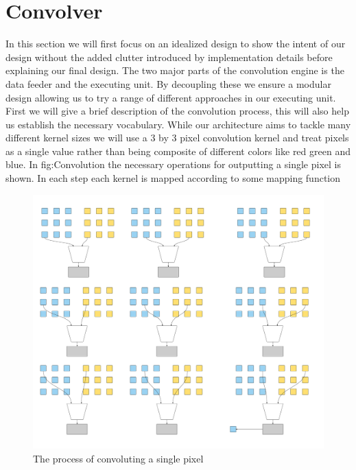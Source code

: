 \section{Convolver}
In this section we will first focus on an idealized design to show the intent of our design without the added clutter introduced by implementation details before explaining our final design.
The two major parts of the convolution engine is the data feeder and the executing unit. By decoupling these we ensure a modular design allowing us to try a range of different approaches in our executing unit.
First we will give a brief description of the convolution process, this will also help us establish the necessary vocabulary. 
While our architecture aims to tackle many different kernel sizes we will use a 3 by 3 pixel convolution kernel and treat pixels as a single value rather than being composite of different colors like red green and blue.
In fig:Convolution the necessary operations for outputting a single pixel is shown. In each step each kernel is mapped according to some mapping function 
\begin{figure}[h!]
    \includegraphics[width=\linewidth]{img/Convolution.png}
    \caption{The process of convoluting a single pixel}
    \label{fig:Convolution}
\end{figure}


